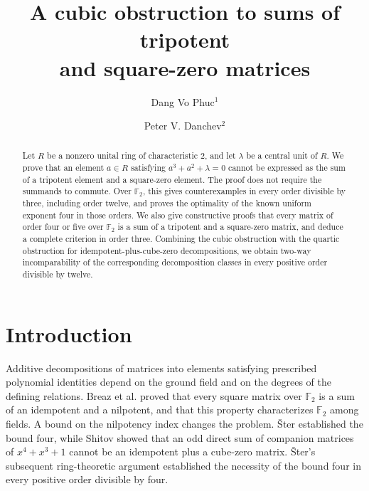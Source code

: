 \documentclass[12pt]{amsart}
\title[A cubic obstruction to matrix decompositions]{A cubic obstruction to sums of tripotent\\ and square-zero matrices}
\author[D. V. Phuc]{Dang Vo Phuc$^{1}$}
\author[P. V. Danchev]{Peter V. Danchev$^{2}$}
\date{}
\theoremstyle{remark}
\numberwithin{equation}{section}
\theoremstyle{definition}
\newcommand{\F}{\mathbb F}
\begin{document}
\begin{abstract}
Let $R$ be a nonzero unital ring of characteristic $2$, and let $\lambda$ be a central unit of $R$. We prove that an element $a\in R$ satisfying $a^3+a^2+\lambda=0$ cannot be expressed as the sum of a tripotent element and a square-zero element. The proof does not require the summands to commute. Over $\F_2$, this gives counterexamples in every order divisible by three, including order twelve, and proves the optimality of the known uniform exponent four in those orders. We also give constructive proofs that every matrix of order four or five over $\F_2$ is a sum of a tripotent and a square-zero matrix, and deduce a complete criterion in order three. Combining the cubic obstruction with the quartic obstruction for idempotent-plus-cube-zero decompositions, we obtain two-way incomparability of the corresponding decomposition classes in every positive order divisible by twelve.
\end{abstract}

\maketitle
\enlargethispage{2pt}

\section{Introduction}

Additive decompositions of matrices into elements satisfying prescribed polynomial identities depend on the ground field and on the degrees of the defining relations. Breaz et al. \cite[Theorem~3]{BCDM} proved that every square matrix over $\F_2$ is a sum of an idempotent and a nilpotent, and that this property characterizes $\F_2$ among fields. A bound on the nilpotency index changes the problem. \v{S}ter \cite{Ster2018} established the bound four, while Shitov \cite[Theorem~1 and its proof]{Shitov} showed that an odd direct sum of companion matrices of $x^4+x^3+1$ cannot be an idempotent plus a cube-zero matrix. \v{S}ter's subsequent ring-theoretic argument \cite[Theorem~3 and Corollary~4]{Ster2022} established the necessity of the bound four in every positive order divisible by four.
\end{document}
